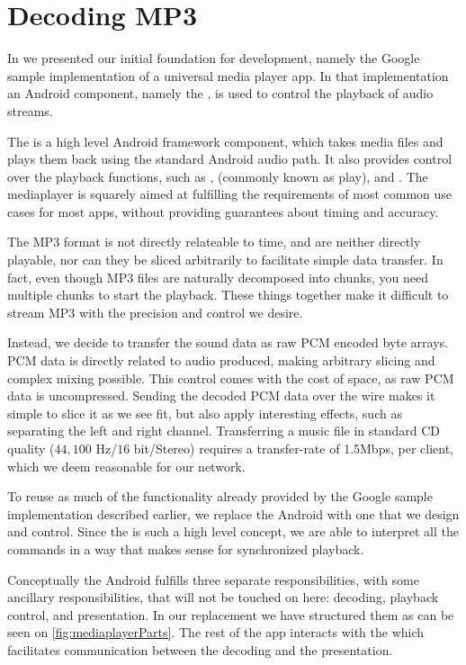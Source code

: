 \section{Decoding MP3}

In  we presented our initial
foundation for development, namely the Google sample implementation of
a universal media player app. In that implementation an Android
component, namely the , is used to
control the playback of audio streams.

The  is a high level Android framework component,
which takes media files and plays them back using the standard Android
audio path. It also provides control over the playback functions, such
as ,  (commonly known as play), and
. The mediaplayer is squarely aimed at fulfilling the
requirements of most common use cases for most apps, without providing
guarantees about timing and accuracy.

The MP3 format is not directly relateable to time, and are
neither directly playable, nor can they be sliced arbitrarily to
facilitate simple data transfer. In fact, even though MP3 files are
naturally decomposed into chunks, you need multiple chunks to start the
playback. These things together make it difficult to stream MP3 with the
precision and control we desire.

Instead, we decide to transfer the sound data as raw \ac{PCM} encoded
byte arrays. \ac{PCM} data is directly related to audio produced, making
arbitrary slicing and complex mixing possible. This control comes with the cost of space,
as raw \ac{PCM} data is uncompressed. Sending the decoded
\ac{PCM} data over the wire makes it simple to slice it as we see fit,
but also apply interesting effects, such as separating the left and
right channel. Transferring a music file in standard CD quality
($44,100$ Hz/$16$ bit/Stereo) requires a transfer-rate of 1.5Mbps, per
client, which we deem reasonable for our network.

To reuse as much of the functionality already provided by the Google sample implementation described earlier, we
replace the Android  with one that we design and
control. Since the  is such a high level concept, we
are able to interpret all the commands in a way that makes sense for
synchronized playback.

Conceptually the Android  fulfills three separate
responsibilities, with some ancillary responsibilities, that will not be
touched on here: decoding, playback control, and presentation. In our
replacement we have structured them as can be seen on
\cref{fig:mediaplayerParts}. The rest of the app interacts with the
 which facilitates communication between the
decoding and the presentation.

